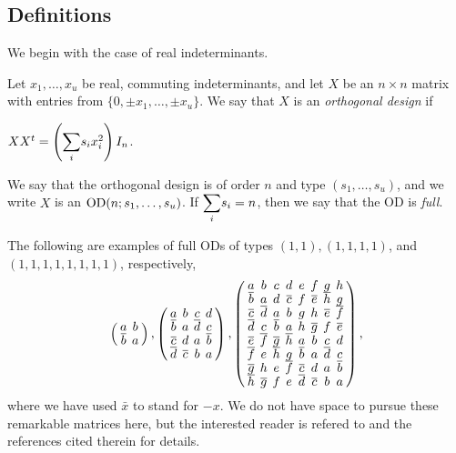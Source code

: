 \documentclass[../../../main]{subfiles}
\begin{document}
 \subsection{Definitions}
 
  We begin with the case of real indeterminants.
 
 \begin{defin}\label{real-od-def}
  Let $x_1, \dots, x_u$ be real, commuting indeterminants, and let $X$ be an $n \times n$ matrix with entries from $\{0,\pm x_1, \dots, \pm x_u\}$. We say that $X$ is an {\it orthogonal design} if
  \begin{defenum}
   \item $XX^t = \left( \ssum_i s_ix_i^2 \right)I_n$.
  \end{defenum}
  We say that the orthogonal design is of order $n$ and type $(s_1, \dots, s_u)$, and we write $X$ is an $\text{OD}(n;s_1, \dots, s_u)$. If $\ssum_i s_i=n$, then we say that the OD is {\it full}.
 \end{defin}
 
 \begin{ex}
 The following are examples of full ODs of types $(1,1),(1,1,1,1)$, and $(1,1,1,1,1,1,1,1)$, respectively,
  \begin{equation}
  \arraycolsep=2.0pt\def\arraystretch{0.5}
   \left(\begin{array}{cc} 
   a&b\\\bar{b}&a 
   \end{array}\right), 
   \arraycolsep=2.0pt\def\arraystretch{0.5}
   \left(\begin{array}{cccc} 
   a&b&c&d\\\bar{b}&a&\bar{d}&c\\\bar{c}&d&a&\bar{b}\\\bar{d}&\bar{c}&b&a 
   \end{array}\right),
   \arraycolsep=2.0pt\def\arraystretch{0.5}
   \left(\begin{array}{cccccccc}
   a&b&c&d&e&f&g&h\\
   \bar b&a&d&\bar c&f&\bar e&\bar h&g\\
   \bar c& \bar d&a&b&g&h&\bar e&\bar f\\
   \bar d&c&\bar b&a&h&\bar g&f&\bar e\\
   \bar e&\bar f&\bar g&\bar h&a&b&c&d\\
   \bar f&e&\bar h&g&\bar b&a&\bar d&c\\
   \bar g&h&e&\bar f&\bar c&d&a&\bar b\\
   \bar h&\bar g&f&e&\bar d&\bar c&b&a
   \end{array}\right),
  \end{equation}
  where we have used $\bar{x}$ to stand for $-x$. We do not have space to pursue these remarkable matrices here, but the interested reader is refered to \cite{seberry-od-2017} and the references cited therein for details.
 \end{ex}
 
\end{document}
